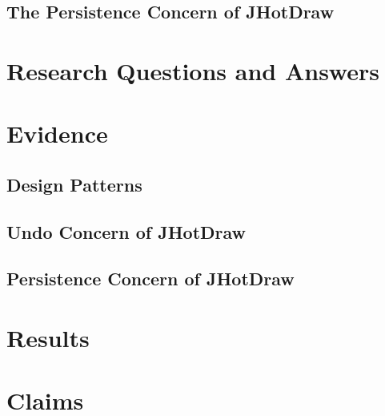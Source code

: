 \subsection{The Persistence Concern of JHotDraw}

\section{Research Questions and Answers}\label{Research Questions and Answers}

\section{Evidence}\label{Evidence}

\subsection{Design Patterns}\label{Design Patterns JHotDraw}

\subsection{Undo Concern of JHotDraw}\label{Undo JHotDraw}

\subsection{Persistence Concern of JHotDraw}\label{Persistence JHotDraw}

\section{Results}\label{Results}

\section{Claims}\label{Claims}